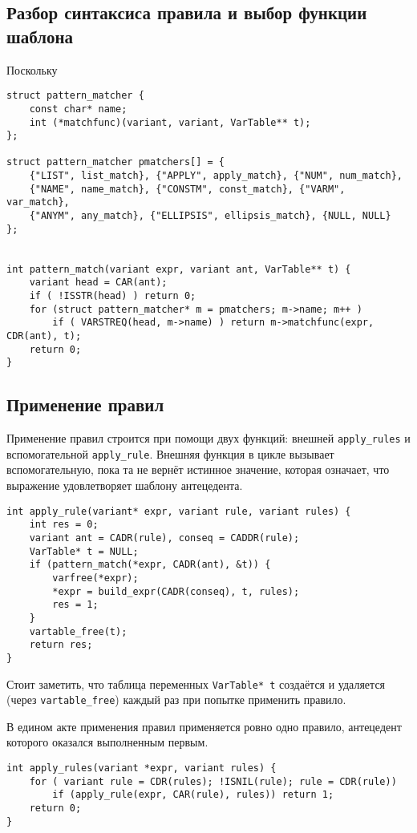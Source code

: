 \documentclass[10pt]{report}
\begin{document}
\subsection{Разбор синтаксиса правила и выбор функции шаблона}
Поскольку  
\begin{lstlisting}[firstnumber=108, caption=pattern.c -- Выбор шаблона по префиксу синтаксической конструкции]
struct pattern_matcher {
	const char* name;
	int (*matchfunc)(variant, variant, VarTable** t);
};

struct pattern_matcher pmatchers[] = {
	{"LIST", list_match}, {"APPLY", apply_match}, {"NUM", num_match},
	{"NAME", name_match}, {"CONSTM", const_match}, {"VARM", var_match},
	{"ANYM", any_match}, {"ELLIPSIS", ellipsis_match}, {NULL, NULL}
};


int pattern_match(variant expr, variant ant, VarTable** t) {
	variant head = CAR(ant);
	if ( !ISSTR(head) ) return 0;
	for (struct pattern_matcher* m = pmatchers; m->name; m++ ) 
		if ( VARSTREQ(head, m->name) ) return m->matchfunc(expr, CDR(ant), t);
	return 0;
}
\end{lstlisting}
\subsection{Применение правил}
Применение правил строится при помощи двух функций: внешней \verb|apply_rules| и вспомогательной \verb|apply_rule|. Внешняя функция в цикле вызывает вспомогательную, пока та не вернёт истинное значение, которая означает, что выражение удовлетворяет шаблону антецедента.
\label{sec:apply-rules}
\begin{lstlisting}[firstnumber=128, caption=pattern.c -- Акт применения правила -- поиск совпадения шаблона и построение выражения]
int apply_rule(variant* expr, variant rule, variant rules) {
	int res = 0;
	variant ant = CADR(rule), conseq = CADDR(rule);
	VarTable* t = NULL;
	if (pattern_match(*expr, CADR(ant), &t)) {
		varfree(*expr);
		*expr = build_expr(CADR(conseq), t, rules);
		res = 1;
	}
	vartable_free(t);
	return res;
}
\end{lstlisting}
Стоит заметить, что таблица переменных \verb|VarTable* t| создаётся и удаляется (через \verb|vartable_free|) каждый раз при попытке применить правило.

В едином акте применения правил применяется ровно одно правило, антецедент которого оказался выполненным первым.
\begin{lstlisting}[firstnumber=141, caption=pattern.c -- Применение правил]
int apply_rules(variant *expr, variant rules) {
	for ( variant rule = CDR(rules); !ISNIL(rule); rule = CDR(rule)) 
		if (apply_rule(expr, CAR(rule), rules)) return 1;
	return 0;
}
\end{lstlisting}
\end{document}
